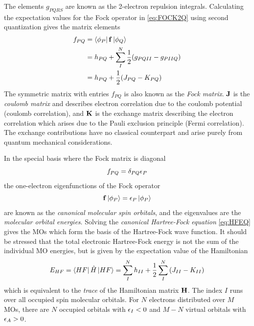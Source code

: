 \noindent The elements $g_{PQRS}$ are known as the 2-electron repulsion integrals. Calculating the expectation values for the Fock operator in \ref{eq:FOCK2Q} using second quantization gives the matrix elements \cite{Hel2000}
\begin{equation}
\begin{split}
f_{PQ} &= \bra{\phi_P} \mathbf{f} \ket{\phi_Q} \\
	&= h_{PQ} + \sum_{I}^N \frac{1}{2} (g_{PQII} - g_{PIIQ}) \\
	&= h_{PQ} + \frac{1}{2} (J_{PQ} - K_{PQ})
\end{split}
\end{equation} 
\noindent The symmetric matrix with entries $f_{PQ}$ is also known as the \emph{Fock matrix}. $\mathbf{J}$ is the \emph{coulomb matrix} and describes electron correlation due to the coulomb potential (coulomb correlation), and $\mathbf{K}$ is the exchange matrix describing the electron correlation which arises due to the Pauli exclusion principle (Fermi correlation). The exchange contributions have no classical counterpart and arise purely from quantum mechanical considerations. 

In the special basis where the Fock matrix is diagonal
\begin{equation}
f_{PQ} = \delta_{PQ} \epsilon_P 
\end{equation}
\noindent the one-electron eigenfunctions of the Fock operator 
\begin{equation}
\mathbf{f} \ket{\phi_P} = \epsilon_P \ket{\phi_P} 
\label{eq:HFEQ}
\end{equation} 
\noindent are known as the \emph{canonical molecular spin orbitals}, and the eigenvalues are the \emph{molecular orbital energies}. Solving the \emph{canonical Hartree-Fock equation} \ref{eq:HFEQ} gives the MOs which form the basis of the Hartree-Fock wave function. It should be stressed that the total electronic Hartree-Fock energy is not the sum of the individual MO energies, but is given by the expectation value of the Hamiltonian 
\begin{equation}
E_{HF} = \bra{HF}\hat{H}\ket{HF} = \sum_{I}^{N} h_{II} + \frac{1}{2} \sum_{I}^{N} \left( J_{II} - K_{II} \right) 
\end{equation}
\noindent which is equivalent to the \emph{trace} of the Hamiltonian matrix $\mathbf{H}$. The index $I$ runs over all occupied spin molecular orbitals. For $N$ electrons distributed over $M$ MOs, there are $N$ occupied orbitals with $\epsilon_I < 0$ and $M-N$ virtual orbitals with $\epsilon_A > 0$. 

